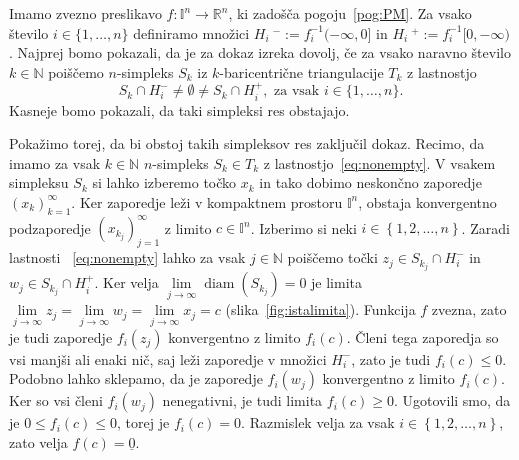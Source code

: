 \documentclass[mat1]{fmfdelo}
\newcommand{\R}{\mathbb R}
\newcommand{\N}{\mathbb N}
\DeclareMathOperator{\diam}{diam}
\newcommand{\I}{\mathbb I}
\newcommand{\0}{\underline{0}}
\begin{document}
\begin{dokaz}
Imamo zvezno preslikavo $f : \I^n \to  \R^n$, ki zadošča pogoju~\eqref{pog:PM}. Za vsako število $i \in \{ 1, \dots, n\}$ definiramo množici $H_i\ ^- := f_i^{-1} (-\infty, 0]$ in $H_i\ ^+ := f_i^{-1} [0, -\infty)$. Najprej bomo pokazali, da je za dokaz izreka dovolj, če za vsako naravno število $k \in \N$ poiščemo $n$-simpleks $S_k$ iz $k$-baricentrične triangulacije $T_k$ z lastnostjo 
\begin{equation}\label{eq:nonempty}
S_k \cap H_i^- \neq \emptyset \neq S_k \cap H_i^+, \text{ za vsak } i \in \{ 1, \dots, n \}.
\end{equation}
Kasneje bomo pokazali, da taki simpleksi res obstajajo.

Pokažimo torej, da bi obstoj takih simpleksov res zaključil dokaz. Recimo, da imamo za vsak $k \in \N$ $n$-simpleks $S_k \in T_k$ z lastnostjo~\eqref{eq:nonempty}. V vsakem simpleksu $S_k$ si lahko izberemo točko $x_k$ in tako dobimo neskončno zaporedje $\left ( x_k \right ) _{k = 1}^{\infty}$. Ker zaporedje leži v kompaktnem prostoru $\I^n$, obstaja konvergentno podzaporedje $\left ( x_{k_j} \right ) _{j = 1}^{\infty}$ z limito $c \in \I^n$. Izberimo si neki $i \in \left \{1, 2, \dots, n\right \}$. Zaradi lastnosti ~\eqref{eq:nonempty} lahko za vsak $j \in \N$ poiščemo točki $z_j \in S_{k_j} \cap H_i^-$ in $w_j \in S_{k_j} \cap H_i^+$. Ker velja $\lim\limits_{j \to \infty} \diam(S_{k_j}) = 0$ je limita  $\lim\limits_{j \to \infty} z_j = \lim\limits_{j \to \infty} w_j = \lim\limits_{j \to \infty} x_j = c$ (slika~\ref{fig:istalimita}). Funkcija $f$ zvezna, zato je tudi zaporedje $f_i(z_j)$ konvergentno z limito $f_i(c)$. Členi tega zaporedja so vsi manjši ali enaki nič, saj leži zaporedje v množici $H_i^-$, zato je tudi $f_i(c) \leq 0$. Podobno lahko sklepamo, da je zaporedje $f_i(w_j)$ konvergentno z limito $f_i(c)$. Ker so vsi členi $f_i(w_j)$ nenegativni, je tudi limita $f_i(c) \geq 0$. Ugotovili smo, da je $0 \leq f_i(c) \leq 0$, torej je $f_i(c) = 0$. Razmislek velja za vsak $i \in \left \{1, 2, \dots, n\right \}$, zato velja $f(c) = \0$.

\begin{figure}[h!]
	\centering
\end{figure}
\end{dokaz}
\end{document}
